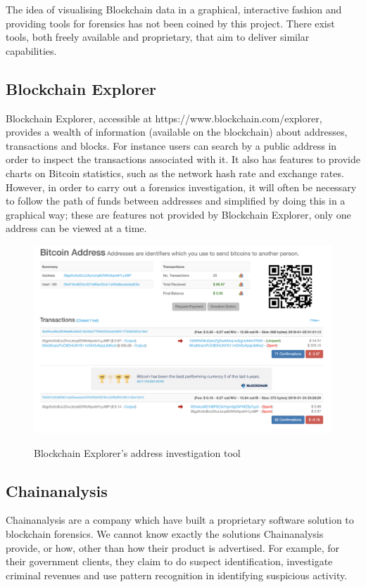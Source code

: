 The idea of visualising Blockchain data in a graphical, interactive fashion and providing tools for forensics has not been coined by this project. There exist tools, both freely available and proprietary, that aim to deliver similar capabilities. 

\subsection{Blockchain Explorer}
Blockchain Explorer, accessible at https://www.blockchain.com/explorer, provides a wealth of information (available on the blockchain) about addresses, transactions and blocks. For instance users can search by a public address in order to inspect the transactions associated with it. It also has features to provide charts on Bitcoin statistics, such as the network hash rate and exchange rates. However, in order to carry out a forensics investigation, it will often be necessary to follow the path of funds between addresses and simplified by doing this in a graphical way; these are features not provided by Blockchain Explorer, only one address can be viewed at a time. 

\begin{figure}[h!]
  \centering
  \includegraphics[width = 15cm]{./figures/chainanalysis}\\[0.5cm] 
  \caption{Blockchain Explorer's address investigation tool \protect \footnotemark}
\end{figure}

\subsection{Chainanalysis}
Chainanalysis are a company which have built a proprietary software solution to blockchain forensics. We cannot know exactly the solutions Chainanalysis provide, or how, other than how their product is advertised. For example, for their government clients, they claim to do suspect identification, investigate criminal revenues and use pattern recognition in identifying suspicious activity. 

